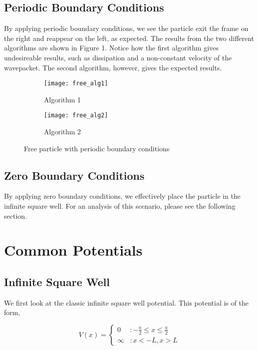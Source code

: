\documentclass{article}
\begin{document}
\subsection{Periodic Boundary Conditions}

By applying periodic boundary conditions, we see the particle exit the frame on the right and reappear on the left, as expected. The results from the two 
different algorithms are shown in Figure 1. Notice how the first algorithm gives undesireable results, such as dissipation and a non-constant velocity of the wavepacket. The second algorithm, however, gives the expected results.


\begin{figure}
\centering
\begin{subfigure}[h!]{0.3\textwidth}
\centering
\texttt{[image: free\_alg1]}
\caption{Algorithm 1}
\end{subfigure}
%
\begin{subfigure}[h!]{0.3\textwidth}
\centering
\texttt{[image: free\_alg2]}
\caption{Algorithm 2}
\end{subfigure}

\caption{Free particle with periodic boundary conditions}
\end{figure}

\subsection{Zero Boundary Conditions}

By applying zero boundary conditions, we effectively place the particle in the infinite square well. For an analysis of this scenario, please see the following section. 

\section{Common Potentials}

\subsection{Infinite Square Well}

We first look at the classic infinite square well potential. This potential is of the form,

\[V(x) = \left\{
  \begin{array}{lr}
    0 &  : -\frac{a}{2} \leq x \leq \frac{a}{2} \\
    \infty & : x < -L , x > L 
  \end{array}
\right.
\]
\end{document}
